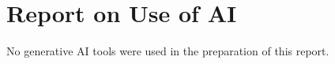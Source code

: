 \documentclass[12pt]{article}
\begin{document}
\section*{Report on Use of AI}

No generative AI tools were used in the preparation of this report.

\end{document}
